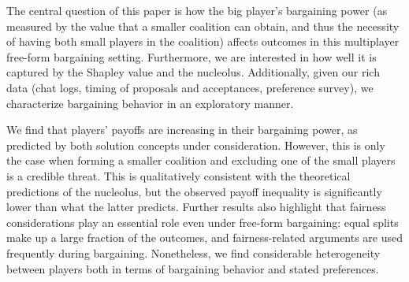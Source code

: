 The central question of this paper is how the big player's bargaining power (as measured by the value that a smaller coalition can obtain, and thus the necessity of having both small players in the coalition) affects outcomes in this multiplayer free-form bargaining setting.
Furthermore, we are interested in how well it is captured by the Shapley value and the nucleolus.
Additionally, given our rich data (chat logs, timing of proposals and acceptances, preference survey), we characterize bargaining behavior in an exploratory manner.

We find that players' payoffs are increasing in their bargaining power, as predicted by both solution concepts under consideration.
However, this is only the case when forming a smaller coalition and excluding one of the small players is a credible threat.
This is qualitatively consistent with the theoretical predictions of the nucleolus, but the observed payoff inequality is significantly lower than what the latter predicts.
Further results also highlight that fairness considerations play an essential role even under free-form bargaining: equal splits make up a large fraction of the outcomes, and fairness-related arguments are used frequently during bargaining.
Nonetheless, we find considerable heterogeneity between players both in terms of bargaining behavior and stated preferences.
